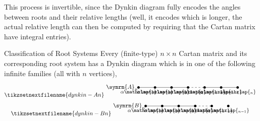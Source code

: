 \documentclass[fleqn]{NotesClass}
\newcommand{\dynkin}[2]{\symrm{#1}_{#2}}
\begin{document}
    This process is invertible, since the Dynkin diagram fully encodes the angles between roots and their relative lengths (well, it encodes which is longer, the actual relative length can then be computed by requiring that the Cartan matrix have integral entries).
    
    \begin{thm}{Classification of Root Systems}{}
        Every (finite-type) \(n \times n\) Cartan matrix and its corresponding root system has a Dynkin diagram which is in one of the following infinite families (all with \(n\) vertices),
        \begin{gather}
            \tikzsetnextfilename{dynkin-An}
            \begin{tikzpicture}[font=\small]
                \node at (-1, 0) {\normalsize\(\dynkin{A}{n}\)};
                \fill (0, 0) circle [radius=0.075cm] node [below] {\(\alpha\mathrlap{_1}\)};
                \fill (1, 0) circle [radius=0.075cm] node [below] {\(\alpha\mathrlap{_2}\)};
                \fill (2, 0) circle [radius=0.075cm] node [below] {\(\alpha\mathrlap{_3}\)};
                \fill (3, 0) circle [radius=0.075cm] node [below] {\(\alpha\mathrlap{_4}\)};
                \draw (0, 0) -- (3, 0);
                \draw [dashed] (3, 0) -- ++ (1, 0);
                \fill (4, 0) circle [radius=0.075cm] node [below] {\(\alpha\mathrlap{_{n-2}}\)};
                \fill (5, 0) circle [radius=0.075cm] node [below] {\(\alpha\mathrlap{_{n-1}}\)};
                \fill (6, 0) circle [radius=0.075cm] node [below] {\(\alpha\mathrlap{_n}\)};
                \draw (4, 0) -- (6, 0);
            \end{tikzpicture}
            \\
            \tikzsetnextfilename{dynkin-Bn}
            \begin{tikzpicture}[font=\small]
                \node at (-1, 0) {\normalsize\(\dynkin{B}{n}\)};
                \fill (0, 0) circle [radius=0.075cm] node [below] {\(\alpha\mathrlap{_1}\)};
                \fill (1, 0) circle [radius=0.075cm] node [below] {\(\alpha\mathrlap{_2}\)};
                \fill (2, 0) circle [radius=0.075cm] node [below] {\(\alpha\mathrlap{_3}\)};
                \fill (3, 0) circle [radius=0.075cm] node [below] {\(\alpha\mathrlap{_4}\)};
                \draw (0, 0) -- (3, 0);
                \draw [dashed] (3, 0) -- ++ (1, 0);
                \fill (4, 0) circle [radius=0.075cm] node [below] {\(\alpha\mathrlap{_{n-2}}\)};
                \fill (5, 0) circle [radius=0.075cm] node [below] {\(\alpha\mathrlap{_{n-1}}\)};

\end{tikzpicture}
\end{gather}
\end{thm}
\end{document}
